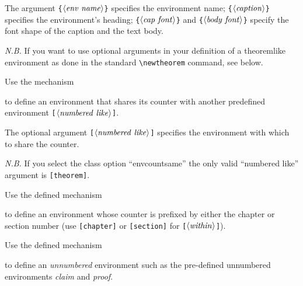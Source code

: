 \documentclass[graybox,square]{svmono}
\begin{document}
\begin{sloppy}
The argument \verb|{|$\langle {\it env~name}\rangle$\verb|}| specifies the environment name; \verb|{|$\langle {\it caption}\rangle$\verb|}| specifies the environment's heading; \verb|{|$\langle {\it cap~font}\rangle$\verb|}| and \verb|{|$\langle {\it body~font}\rangle$\verb|}| specify the font shape of the caption and the text body.

{\it N.B.} If you want to use optional arguments in your definition of a theoremlike environment as done in the standard \verb|\newtheorem| command, see below.

\eject

Use the mechanism
\cprotect{}

to define an environment that shares its counter with another predefined environment \verb|[|$\langle {\it numbered~like}\rangle$\verb|]|.

The optional argument \verb|[|$\langle {\it numbered~like}\rangle$\verb|]| specifies the environment with which to share the counter.


{\it N.B.} If you select the class option ``envcountsame'' the only valid ``numbered like'' argument is \verb|[theorem]|.



Use the defined mechanism

\cprotect{}

to define an environment whose counter is prefixed by either the chapter or section number (use \verb|[chapter]| or \verb|[section]| for \verb|[|$\langle {\it within}\rangle$\verb|]|).

Use the defined mechanism

\cprotect{}

to define an {\it unnumbered} environment such as the pre-defined unnumbered environments {\it claim} and {\it proof}.


\end{sloppy}
\end{document}
